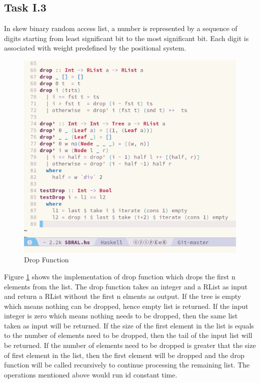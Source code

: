 \documentclass{article}
\begin{document}
\begin{normalsize}
  \section{Task I.3}

  In skew binary random access list, a number is represented by a sequence of
  digits starting from least significant bit to the most significant bit. Each
  digit is associated with weight predefined by the positional system.
  
  \begin{figure}[H]
    \centering
    \centerline{\includegraphics[scale=0.6]{SBRAL-Drop}}
    \caption{Drop Function}
    \label{fig:drop}
  \end{figure}

  Figure \ref{fig:drop} shows the implementation of drop function which drops
  the first n elements from the list. The drop function takes an integer and a
  RList as input and return a RList without the first n elments as output. If
  the tree is empty which means nothing can be dropped, hence empty list is
  returned. If the input integer is zero which means nothing needs to be
  dropped, then the same list taken as input will be returned. If the size of
  the first element in the list is equals to the number of elements need to be
  dropped, then the tail of the input list will be returned. If the number of
  elements need to be dropped is greater that the size of first element in the
  list, then the first element will be dropped and the drop function will be
  called recursively to continue processing the remaining list. The operations
  mentioned above would run id constant time.


\end{normalsize}
\end{document}
